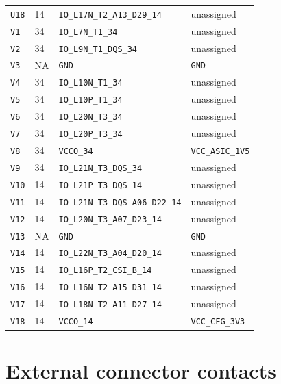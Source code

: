 \documentclass[11pt,a4paper]{article}
\begin{document}
\begin{longtable}{@{}P{13mm}P{13mm}P{78mm}P{62mm}@{}}
\nolinkurl{U18} & 14 & \nolinkurl{IO_L17N_T2_A13_D29_14} & \textcolor{muted}{unassigned} \\
\nolinkurl{V1} & 34 & \nolinkurl{IO_L7N_T1_34} & \textcolor{muted}{unassigned} \\
\nolinkurl{V2} & 34 & \nolinkurl{IO_L9N_T1_DQS_34} & \textcolor{muted}{unassigned} \\
\nolinkurl{V3} & NA & \nolinkurl{GND} & \nolinkurl{GND} \\
\nolinkurl{V4} & 34 & \nolinkurl{IO_L10N_T1_34} & \textcolor{muted}{unassigned} \\
\nolinkurl{V5} & 34 & \nolinkurl{IO_L10P_T1_34} & \textcolor{muted}{unassigned} \\
\nolinkurl{V6} & 34 & \nolinkurl{IO_L20N_T3_34} & \textcolor{muted}{unassigned} \\
\nolinkurl{V7} & 34 & \nolinkurl{IO_L20P_T3_34} & \textcolor{muted}{unassigned} \\
\nolinkurl{V8} & 34 & \nolinkurl{VCCO_34} & \nolinkurl{VCC_ASIC_1V5} \\
\nolinkurl{V9} & 34 & \nolinkurl{IO_L21N_T3_DQS_34} & \textcolor{muted}{unassigned} \\
\nolinkurl{V10} & 14 & \nolinkurl{IO_L21P_T3_DQS_14} & \textcolor{muted}{unassigned} \\
\nolinkurl{V11} & 14 & \nolinkurl{IO_L21N_T3_DQS_A06_D22_14} & \textcolor{muted}{unassigned} \\
\nolinkurl{V12} & 14 & \nolinkurl{IO_L20N_T3_A07_D23_14} & \textcolor{muted}{unassigned} \\
\nolinkurl{V13} & NA & \nolinkurl{GND} & \nolinkurl{GND} \\
\nolinkurl{V14} & 14 & \nolinkurl{IO_L22N_T3_A04_D20_14} & \textcolor{muted}{unassigned} \\
\nolinkurl{V15} & 14 & \nolinkurl{IO_L16P_T2_CSI_B_14} & \textcolor{muted}{unassigned} \\
\nolinkurl{V16} & 14 & \nolinkurl{IO_L16N_T2_A15_D31_14} & \textcolor{muted}{unassigned} \\
\nolinkurl{V17} & 14 & \nolinkurl{IO_L18N_T2_A11_D27_14} & \textcolor{muted}{unassigned} \\
\nolinkurl{V18} & 14 & \nolinkurl{VCCO_14} & \nolinkurl{VCC_CFG_3V3} \\
\end{longtable}\endgroup

\clearpage\section{External connector contacts}
\end{document}
